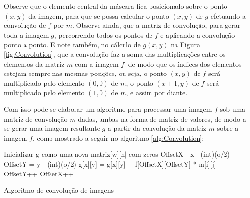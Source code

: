 Observe que o elemento central da máscara fica posicionado sobre o ponto \((x,y)\) da imagem, para que se possa calcular o ponto \((x,y)\) de \(g\) efetuando a convolução de \(f\) por \(m\). Observe ainda, que a matriz de convolução, para gerar toda a imagem \(g\), percorrendo todos os pontos de \(f\)  e aplicando a convolução ponto a ponto. E note também, no cálculo de \(g(x,y)\) na Figura \ref{fig:Convolution}, que a convolução faz a soma das multiplicações entre os elementos da matriz \(m\) com a imagem \(f\), de modo que os índices dos elementos estejam sempre nas mesmas posições, ou seja, o ponto \((x,y)\) de \(f\) será multiplicado pelo elemento \((0,0)\) de \(m\), o ponto \((x+1,y)\) de \(f\) será multiplicado pelo elemento \((1,0)\) de \(m\), e assim por diante.

Com isso pode-se elaborar um algoritmo para processar uma imagem \(f\) sob uma matriz de convolução \(m\) dadas, ambas na forma de matriz de valores, de modo a se gerar uma imagem resultante \(g\) a partir da convolução da matriz \(m\) sobre a imagem \(f\), como mostrado a seguir no algoritmo \ref{alg:Convolution}:

\begin{algorithm}[H]
\SetAlgoLined
{}
Inicializar g como uma nova matriz[w][h] com zeros\;
{
  {
    OffsetX - x - (int)(o/2)\;
    {
      OffsetY = y - (int)(o/2)\;
      {
        {
        g[x][y] = g[x][y] + f[OffsetX][OffsetY] * m[i][j]\; 
        }
        OffsetY++\;
      }
      OffsetX++\;
    }
  }
}
\caption{Algoritmo de convolução de imagens}
\label{alg:Convolution}
\end{algorithm}

